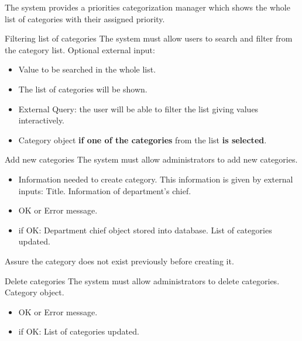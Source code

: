 
The system provides a priorities categorization manager which shows the whole list of categories with their assigned priority.

\begin{requirement}{Filtering list of categories}
\reqdesc The system must allow users to search and filter from the category list.
\reqin Optional external input:
\begin{itemize}
	\item Value to be searched in the whole list.
\end{itemize}
\reqout \begin{itemize}
	\item The list of categories will be shown.
	\item External Query: the user will be able to filter the list giving values interactively.
	\item Category object \textbf{if one of the categories} from the list \textbf{is selected}.
\end{itemize}
\end{requirement}


\begin{requirement}{Add new categories}
\reqdesc  The system must allow administrators to add new categories.
\reqin \begin{itemize}
	\item Information needed to create category. This information is given by external inputs:
		\subitem Title.
		\subitem Information of department's chief. 
\end{itemize}
\reqout \begin{itemize}
	\item OK or Error message.
	\item if OK:
		\subitem Department chief object stored into database.
		\subitem List of categories updated.
\end{itemize}
\reqsteps Assure the category does not exist previously before creating it.
\end{requirement}

\begin{requirement}{Delete categories}
\reqdesc  The system must allow administrators to delete categories.
\reqin Category object.
\reqout \begin{itemize}
	\item OK or Error message.
	\item if OK:
		\subitem List of categories updated.
\end{itemize}
\end{requirement}


